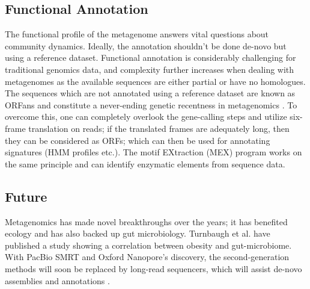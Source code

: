 \subsection{Functional Annotation}
The functional profile of the metagenome answers vital questions about community dynamics. Ideally, the annotation shouldn't be done de-novo but using a reference dataset. Functional annotation is considerably challenging for traditional genomics data, and complexity further increases when dealing with metagenomes as the available sequences are either partial or have no homologues. The sequences which are not annotated using a reference dataset are known as ORFans and constitute a never-ending genetic recentness in metagenomics \cite{ref12}. To overcome this, one can completely overlook the gene-calling steps and utilize six-frame translation on reads; if the translated frames are adequately long, then they can be considered as ORFs; which can then be used for annotating signatures (HMM profiles etc.). The motif EXtraction (MEX) program works on the same principle and can identify enzymatic elements from sequence data.

\subsection{Future}
Metagenomics has made novel breakthroughs over the years; it has benefited ecology and has also backed up gut microbiology. Turnbaugh et al. have published a study showing a correlation between obesity and gut-microbiome. With PacBio SMRT and Oxford Nanopore's discovery, the second-generation methods will soon be replaced by long-read sequencers, which will assist de-novo assemblies and annotations \cite{ref13}.